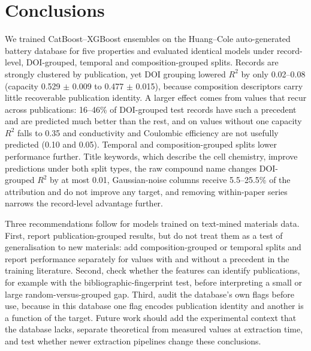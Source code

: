 \documentclass[journal=jcisd8,manuscript=article,layout=traditional]{achemso}
\begin{document}
\section{Conclusions}
\label{sec:conclusion}

We trained CatBoost--XGBoost ensembles on the Huang--Cole auto-generated battery database for five properties and evaluated identical models under record-level, DOI-grouped, temporal and composition-grouped splits. Records are strongly clustered by publication, yet DOI grouping lowered $R^2$ by only 0.02--0.08 (capacity 0.529 $\pm$ 0.009 to 0.477 $\pm$ 0.015), because composition descriptors carry little recoverable publication identity. A larger effect comes from values that recur across publications: 16--46\% of DOI-grouped test records have such a precedent and are predicted much better than the rest, and on values without one capacity $R^2$ falls to 0.35 and conductivity and Coulombic efficiency are not usefully predicted (0.10 and 0.05). Temporal and composition-grouped splits lower performance further. Title keywords, which describe the cell chemistry, improve predictions under both split types, the raw compound name changes DOI-grouped $R^2$ by at most 0.01, Gaussian-noise columns receive 5.5--25.5\% of the attribution and do not improve any target, and removing within-paper series narrows the record-level advantage further.

Three recommendations follow for models trained on text-mined materials data. First, report publication-grouped results, but do not treat them as a test of generalisation to new materials: add composition-grouped or temporal splits and report performance separately for values with and without a precedent in the training literature. Second, check whether the features can identify publications, for example with the bibliographic-fingerprint test, before interpreting a small or large random-versus-grouped gap. Third, audit the database's own flags before use, because in this database one flag encodes publication identity and another is a function of the target. Future work should add the experimental context that the database lacks, separate theoretical from measured values at extraction time, and test whether newer extraction pipelines \cite{huang2022batterybert,dagdelen2024structured} change these conclusions.
\end{document}
